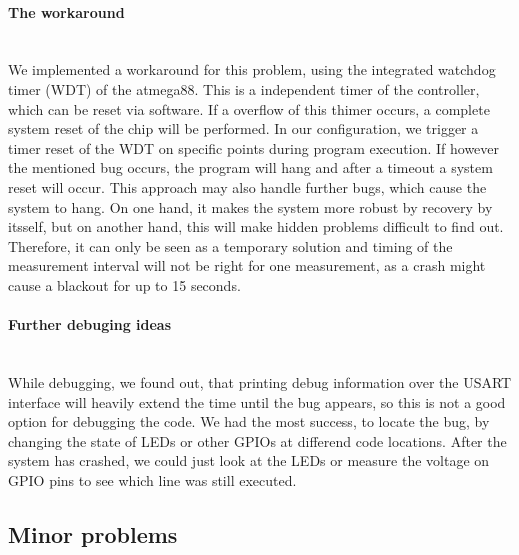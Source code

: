 \documentclass[a4paper]{scrreprt}
\begin{document}
\paragraph{The workaround}\hspace{1cm}\\
We implemented a workaround for this problem, using the integrated watchdog
timer (WDT) of the atmega88. This is a independent timer of the
controller, which can be reset via software. If a overflow of this thimer occurs,
a complete system reset of the chip will be performed. In our configuration, we
trigger a timer reset of the WDT on specific points during program execution.
If however the mentioned bug occurs, the program will hang and after a timeout
a system reset will occur. 
This approach may also handle further bugs, which cause the system to hang.
On one hand, it makes the system more robust by recovery by itsself,
but on another hand, this will make hidden problems difficult to find out. 
Therefore, it can only be seen as a temporary solution and timing of the measurement interval will not be right
for one measurement, as a crash might cause a blackout for up to 15 seconds.
\paragraph{Further debuging ideas}\hspace{1cm}\\
While debugging, we found out, that printing debug information over the USART
interface will heavily extend the time until the bug appears, so this is not a
good option for debugging the code. We had the most success, to locate the bug,
by changing the state of LEDs or other GPIOs at differend code locations. After
the system has crashed, we could just look at the LEDs or measure the voltage on
GPIO pins to see which line was still executed.
\subsection{Minor problems}
\end{document}
